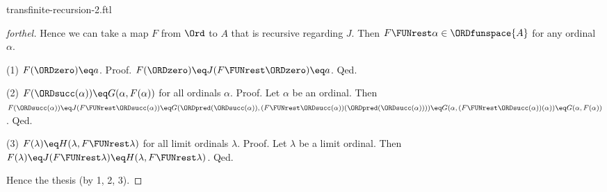 \documentclass{naproche-library}
\begin{document}
\begin{smodule}[title=Transfinite Recursion II]{transfinite-recursion-2.ftl}
\begin{proof}[forthel]
  Hence we can take a map $F$ from $\Ord$ to $A$ that is recursive regarding $J$.
  Then $F \FUNrest \alpha \in \ORDfunspace{A}$ for any ordinal $\alpha$.

  (1) $F(\ORDzero) \eq a$. \newline
  Proof.
    $F(\ORDzero)
      \eq J(F \FUNrest \ORDzero)
      \eq a$.
  Qed.

  (2) $F(\ORDsucc(\alpha)) \eq G(\alpha, F(\alpha))$ for all ordinals $\alpha$. \newline
  Proof.
    Let $\alpha$ be an ordinal.
    Then $F(\ORDsucc(\alpha))
      \eq J(F \FUNrest \ORDsucc(\alpha))
      \eq G(\ORDpred(\ORDsucc(\alpha)), (F \FUNrest \ORDsucc(\alpha))(\ORDpred(\ORDsucc(\alpha))))
      \eq G(\alpha, (F \FUNrest \ORDsucc(\alpha))(\alpha))
      \eq G(\alpha, F(\alpha))$.
  Qed.

  (3) $F(\lambda) \eq H(\lambda, F \FUNrest \lambda)$ for all limit ordinals $\lambda$. \newline
  Proof.
    Let $\lambda$ be a limit ordinal.
    Then $F(\lambda)
      \eq J(F \FUNrest \lambda)
      \eq H(\lambda, F \FUNrest \lambda)$.
  Qed.

  Hence the thesis (by 1, 2, 3).
\end{proof}
\end{smodule}
\end{document}

